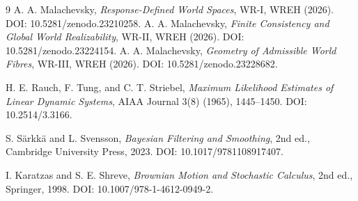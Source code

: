 \documentclass[11pt]{article}
\begin{document}
\begin{thebibliography}{9}
 A. A. Malachevsky, \emph{Response-Defined World Spaces}, WR-I, WREH (2026). DOI: 10.5281/zenodo.23210258.
 A. A. Malachevsky, \emph{Finite Consistency and Global World Realizability}, WR-II, WREH (2026). DOI: 10.5281/zenodo.23224154.
 A. A. Malachevsky, \emph{Geometry of Admissible World Fibres}, WR-III, WREH (2026). DOI: 10.5281/zenodo.23228682.

H. E. Rauch, F. Tung, and C. T. Striebel,
\emph{Maximum Likelihood Estimates of Linear Dynamic Systems},
AIAA Journal 3(8) (1965), 1445--1450.
DOI: 10.2514/3.3166.

S. S\"arkk\"a and L. Svensson,
\emph{Bayesian Filtering and Smoothing}, 2nd ed.,
Cambridge University Press, 2023.
DOI: 10.1017/9781108917407.

I. Karatzas and S. E. Shreve,
\emph{Brownian Motion and Stochastic Calculus}, 2nd ed.,
Springer, 1998.
DOI: 10.1007/978-1-4612-0949-2.
\end{thebibliography}
\end{document}
